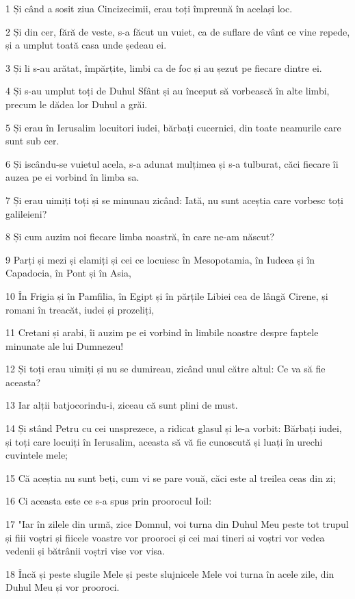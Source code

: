 \par 1 Și când a sosit ziua Cincizecimii, erau toți împreună în același loc.
\par 2 Și din cer, fără de veste, s-a făcut un vuiet, ca de suflare de vânt ce vine repede, și a umplut toată casa unde ședeau ei.
\par 3 Și li s-au arătat, împărțite, limbi ca de foc și au șezut pe fiecare dintre ei.
\par 4 Și s-au umplut toți de Duhul Sfânt și au început să vorbească în alte limbi, precum le dădea lor Duhul a grăi.
\par 5 Și erau în Ierusalim locuitori iudei, bărbați cucernici, din toate neamurile care sunt sub cer.
\par 6 Și iscându-se vuietul acela, s-a adunat mulțimea și s-a tulburat, căci fiecare îi auzea pe ei vorbind în limba sa.
\par 7 Și erau uimiți toți și se minunau zicând: Iată, nu sunt aceștia care vorbesc toți galileieni?
\par 8 Și cum auzim noi fiecare limba noastră, în care ne-am născut?
\par 9 Parți și mezi și elamiți și cei ce locuiesc în Mesopotamia, în Iudeea și în Capadocia, în Pont și în Asia,
\par 10 În Frigia și în Pamfilia, în Egipt și în părțile Libiei cea de lângă Cirene, și romani în treacăt, iudei și prozeliți,
\par 11 Cretani și arabi, îi auzim pe ei vorbind în limbile noastre despre faptele minunate ale lui Dumnezeu!
\par 12 Și toți erau uimiți și nu se dumireau, zicând unul către altul: Ce va să fie aceasta?
\par 13 Iar alții batjocorindu-i, ziceau că sunt plini de must.
\par 14 Și stând Petru cu cei unsprezece, a ridicat glasul și le-a vorbit: Bărbați iudei, și toți care locuiți în Ierusalim, aceasta să vă fie cunoscută și luați în urechi cuvintele mele;
\par 15 Că aceștia nu sunt beți, cum vi se pare vouă, căci este al treilea ceas din zi;
\par 16 Ci aceasta este ce s-a spus prin proorocul Ioil:
\par 17 "Iar în zilele din urmă, zice Domnul, voi turna din Duhul Meu peste tot trupul și fiii voștri și fiicele voastre vor prooroci și cei mai tineri ai voștri vor vedea vedenii și bătrânii voștri vise vor visa.
\par 18 Încă și peste slugile Mele și peste slujnicele Mele voi turna în acele zile, din Duhul Meu și vor prooroci.
